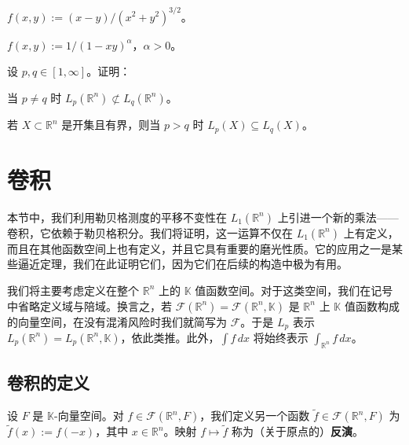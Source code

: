 \begin{exercises}
\begin{items}
$ f(x,y) := (x-y)/(x^2+y^2)^{3/2} $。

\item

$ f(x,y) := 1/(1-xy)^\alpha $，$ \alpha > 0 $。

\end{items}

\item

设 $ p,q \in [1,\infty] $。证明：

\begin{items}
\item

当 $ p \ne q $ 时 $ L_p(\mathbb{R}^n) \not\subset L_q(\mathbb{R}^n) $。

\item

若 $ X \subset \mathbb{R}^n $ 是开集且有界，则当 $ p > q $ 时 $ L_p(X) \subseteq L_q(X) $。

\end{items}

\end{exercises}

\section{卷积}

本节中，我们利用勒贝格测度的平移不变性在 $ L_{1}(\mathbb{R}^{n}) $ 上引进一个新的乘法——卷积，它依赖于勒贝格积分。我们将证明，这一运算不仅在 $ L_{1}(\mathbb{R}^{n}) $ 上有定义，而且在其他函数空间上也有定义，并且它具有重要的磨光性质。它的应用之一是某些逼近定理，我们在此证明它们，因为它们在后续的构造中极为有用。

我们将主要考虑定义在整个 $ \mathbb{R}^{n} $ 上的 $ \mathbb{K} $ 值函数空间。对于这类空间，我们在记号中省略定义域与陪域。换言之，若 $ \mathcal{F}(\mathbb{R}^{n}) = \mathcal{F}(\mathbb{R}^{n},\mathbb{K}) $ 是 $ \mathbb{R}^{n} $ 上 $ \mathbb{K} $ 值函数构成的向量空间，在没有混淆风险时我们就简写为 $ \mathcal{F} $。于是 $ L_{p} $ 表示 $ L_{p}(\mathbb{R}^{n}) = L_{p}(\mathbb{R}^{n},\mathbb{K}) $，依此类推。此外，$ \int f\,dx $ 将始终表示 $ \int_{\mathbb{R}^{n}} f\,dx $。

\subsection*{卷积的定义}

设 $ F $ 是 $ \mathbb{K} $-向量空间。对 $ f \in \mathcal{F}(\mathbb{R}^{n},F) $，我们定义另一个函数 $ \tilde{f} \in \mathcal{F}(\mathbb{R}^{n},F) $ 为 $ \tilde{f}(x) := f(-x) $，其中 $ x \in \mathbb{R}^{n} $。映射 $ f \mapsto \tilde{f} $ 称为（关于原点的）\textbf{反演}。

